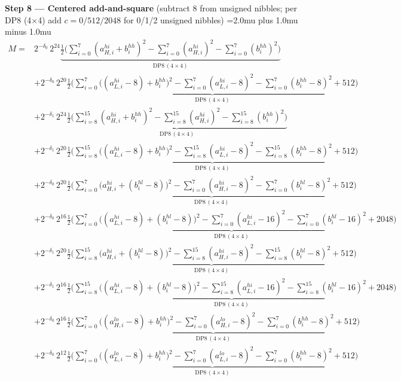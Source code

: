 \documentclass[fleqn]{article}
\newcommand{\DPop}[3]{\mathrm{DP#1}\,(#2\!\times\!#3)}
\begin{document}
\textbf{Step 8 --- Centered add-and-square}\quad
{\small(subtract $8$ from unsigned nibbles; per DP8 (4$\times$4) add $c=0/512/2048$ for 0/1/2 unsigned nibbles)}
{\small\setlength{\jot}{1pt}\medmuskip=2.0mu plus 1.0mu minus 1.0mu
\begin{align*}
M = {}
  & 2^{-\delta_0}\,2^{24}\underbrace{\tfrac12\Big(\sum_{i=0}^{7}(a_{H,i}^{hi}{+}b_i^{hh})^2 - \sum_{i=0}^{7}(a_{H,i}^{hi})^2 - \sum_{i=0}^{7}(b_i^{hh})^2\Big)}_{\DPop{8}{4}{4}} \\[0.25em]
  & + 2^{-\delta_0}\,2^{20}\underbrace{\tfrac12\Big(\sum_{i=0}^{7}\big((a_{L,i}^{hi}{-}8){+}b_i^{hh}\big)^2 - \sum_{i=0}^{7}(a_{L,i}^{hi}{-}8)^2 - \sum_{i=0}^{7}(b_i^{hh}{-}8)^2 + 512\Big)}_{\DPop{8}{4}{4}} \\[0.25em]
  & + 2^{-\delta_1}\,2^{24}\underbrace{\tfrac12\Big(\sum_{i=8}^{15}(a_{H,i}^{hi}{+}b_i^{hh})^2 - \sum_{i=8}^{15}(a_{H,i}^{hi})^2 - \sum_{i=8}^{15}(b_i^{hh})^2\Big)}_{\DPop{8}{4}{4}} \\[0.25em]
  & + 2^{-\delta_1}\,2^{20}\underbrace{\tfrac12\Big(\sum_{i=8}^{15}\big((a_{L,i}^{hi}{-}8){+}b_i^{hh}\big)^2 - \sum_{i=8}^{15}(a_{L,i}^{hi}{-}8)^2 - \sum_{i=8}^{15}(b_i^{hh}{-}8)^2 + 512\Big)}_{\DPop{8}{4}{4}} \\[0.25em]
  & + 2^{-\delta_0}\,2^{20}\underbrace{\tfrac12\Big(\sum_{i=0}^{7}\big(a_{H,i}^{hi}{+}(b_i^{hl}{-}8)\big)^2 - \sum_{i=0}^{7}(a_{H,i}^{hi}{-}8)^2 - \sum_{i=0}^{7}(b_i^{hl}{-}8)^2 + 512\Big)}_{\DPop{8}{4}{4}} \\[0.25em]
  & + 2^{-\delta_0}\,2^{16}\underbrace{\tfrac12\Big(\sum_{i=0}^{7}\big((a_{L,i}^{hi}{-}8){+}(b_i^{hl}{-}8)\big)^2 - \sum_{i=0}^{7}(a_{L,i}^{hi}{-}16)^2 - \sum_{i=0}^{7}(b_i^{hl}{-}16)^2 + 2048\Big)}_{\DPop{8}{4}{4}} \\[0.25em]
  & + 2^{-\delta_1}\,2^{20}\underbrace{\tfrac12\Big(\sum_{i=8}^{15}\big(a_{H,i}^{hi}{+}(b_i^{hl}{-}8)\big)^2 - \sum_{i=8}^{15}(a_{H,i}^{hi}{-}8)^2 - \sum_{i=8}^{15}(b_i^{hl}{-}8)^2 + 512\Big)}_{\DPop{8}{4}{4}} \\[0.25em]
  & + 2^{-\delta_1}\,2^{16}\underbrace{\tfrac12\Big(\sum_{i=8}^{15}\big((a_{L,i}^{hi}{-}8){+}(b_i^{hl}{-}8)\big)^2 - \sum_{i=8}^{15}(a_{L,i}^{hi}{-}16)^2 - \sum_{i=8}^{15}(b_i^{hl}{-}16)^2 + 2048\Big)}_{\DPop{8}{4}{4}} \\[0.25em]
  & + 2^{-\delta_0}\,2^{16}\underbrace{\tfrac12\Big(\sum_{i=0}^{7}\big((a_{H,i}^{lo}{-}8){+}b_i^{hh}\big)^2 - \sum_{i=0}^{7}(a_{H,i}^{lo}{-}8)^2 - \sum_{i=0}^{7}(b_i^{hh}{-}8)^2 + 512\Big)}_{\DPop{8}{4}{4}} \\[0.25em]
  & + 2^{-\delta_0}\,2^{12}\underbrace{\tfrac12\Big(\sum_{i=0}^{7}\big((a_{L,i}^{lo}{-}8){+}b_i^{hh}\big)^2 - \sum_{i=0}^{7}(a_{L,i}^{lo}{-}8)^2 - \sum_{i=0}^{7}(b_i^{hh}{-}8)^2 + 512\Big)}_{\DPop{8}{4}{4}} \\[0.25em]

\end{align*}}
\end{document}
